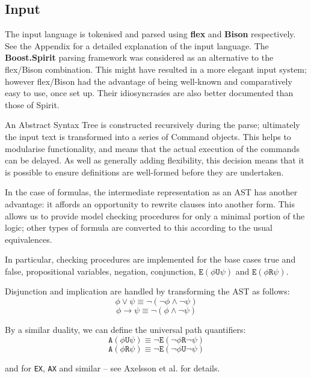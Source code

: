 \documentclass[11pt]{article}
\theoremstyle{definition}
\begin{document}




\subsection{Input}

The input language is tokenised and parsed using \textbf{flex} and
\textbf{Bison} respectively. See the Appendix for a detailed explanation of the
input language. The \textbf{Boost.Spirit} parsing framework was considered as
an alternative to the flex/Bison combination. This might have resulted in a
more elegant input system; however flex/Bison had the advantage of being
well-known and comparatively easy to use, once set up. Their idiosyncrasies are
also better documented than those of Spirit.

An Abstract Syntax Tree is constructed recursively during the parse; ultimately
the input text is transformed into a series of Command objects. This helps to
modularise functionality, and means that the actual execution of the commands
can be delayed. As well as generally adding flexibility, this decision means
that it is possible to ensure definitions are well-formed before they are
undertaken.

In the case of formulas, the intermediate representation as an AST has another
advantage: it affords an opportunity to rewrite clauses into another form.
This allows us to provide model checking procedures for only a minimal portion
of the logic; other types of formula are converted to this according to the
usual equivalences.

In particular, checking procedures are implemented for the base cases true and
false, propositional variables, negation, conjunction,
$\texttt{E}(\phi\texttt{U}\psi)$ and $\texttt{E}(\phi\texttt{R}\psi)$.

Disjunction and implication are handled by transforming the AST as follows:
\[ \phi \vee \psi \equiv \neg ( \neg \phi \wedge \neg \psi ) \]
\[ \phi \rightarrow \psi \equiv \neg ( \phi \wedge \neg \psi ) \]

By a similar duality, we can define the universal path quantifiers:\cite{Kreutzer10}
\[ \texttt{A}(\phi\texttt{U}\psi) \equiv \neg\texttt{E}(\neg\phi\texttt{R}\neg\psi) \]
\[ \texttt{A}(\phi\texttt{R}\psi) \equiv \neg\texttt{E}(\neg\phi\texttt{U}\neg\psi) \]

and for \texttt{EX}, \texttt{AX} and similar -- see Axelsson et al. for
details.
\end{document}
